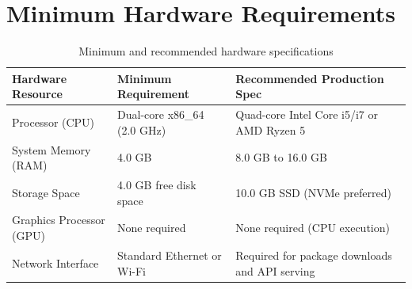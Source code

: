 \section{Minimum Hardware Requirements}
\label{sec:appendix_hardware}
\begin{table}[h!]
\centering
\small
\begin{tabular}{llp{7cm}}
\toprule
\textbf{Hardware Resource} & \textbf{Minimum Requirement} & \textbf{Recommended Production Spec} \\
\midrule
Processor (CPU) & Dual-core x86\_64 (2.0 GHz) & Quad-core Intel Core i5/i7 or AMD Ryzen 5 \\
System Memory (RAM) & 4.0 GB & 8.0 GB to 16.0 GB \\
Storage Space & 4.0 GB free disk space & 10.0 GB SSD (NVMe preferred) \\
Graphics Processor (GPU) & None required & None required (CPU execution) \\
Network Interface & Standard Ethernet or Wi-Fi & Required for package downloads and API serving \\
\bottomrule
\end{tabular}
\caption{Minimum and recommended hardware specifications}
\label{tab:hardware_requirements}
\end{table}
